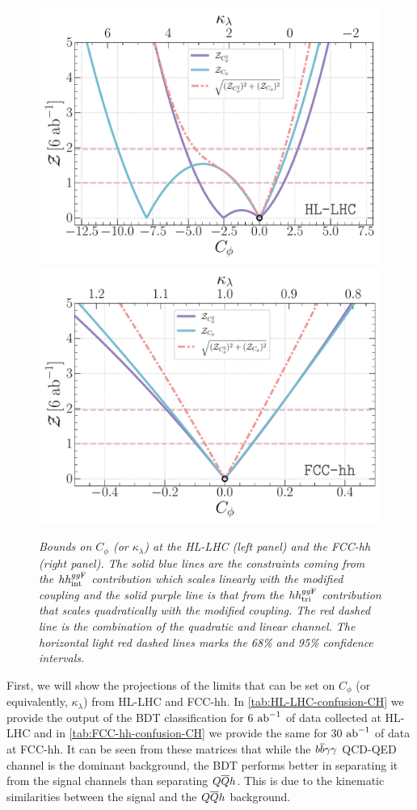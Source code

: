 \begin{figure}[h!]
	\centering
	\includegraphics[width=0.47\linewidth]{fig/HL-LHC-sig14.pdf}
	\includegraphics[width=0.47\linewidth]{fig/FCC-hh-sig100.pdf}
	\caption{\it Bounds on $C_\phi$ (or $\kappa_\lambda$) at the HL-LHC (left panel) and the FCC-hh (right panel). The solid blue lines are the constraints coming from the $hh^{gg\rm F}_{\rm int}$ contribution which scales linearly with the modified coupling and the solid purple line is that from the $hh^{gg\rm F}_{\rm tri}$ contribution that scales quadratically with the modified coupling. The red dashed line is the combination of the quadratic and linear channel. The horizontal light red dashed lines marks the 68\% and 95\% confidence intervals.}
	\label{fig:constraintkl}
\end{figure}

First, we will show the projections of the limits that can be set on $C_\phi$ (or equivalently, $\kappa_\lambda$) from HL-LHC and FCC-hh. In \autoref{tab:HL-LHC-confusion-CH} we provide the output of the BDT classification for 6 $\text{ab}^{-1}$ of data collected at HL-LHC and in \autoref{tab:FCC-hh-confusion-CH} we provide the same for 30 $\text{ab}^{-1}$ of data at FCC-hh. It can be seen from these matrices that while the $b\overline b\gamma\gamma$ QCD-QED channel is the dominant background, the BDT performs better in separating it from the signal channels than separating $Q\overline Q h$. This is due to the kinematic similarities between the signal and the $Q\overline Q h$ background.

